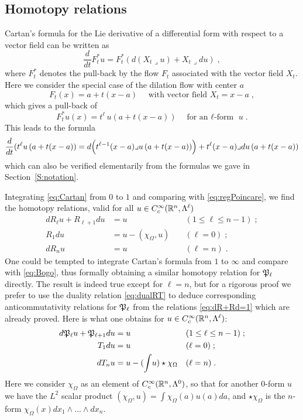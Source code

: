 \documentclass[a4paper]{article}
\begin{document}
\subsection{Homotopy relations}

Cartan's formula for the Lie derivative of a differential form with respect to a vector field can be written as
$$
  \frac{d}{dt}F^*_t u = F^*_t \left(d(X_t\lrcorner u) + X_t\lrcorner du\right)\;,
$$
where $F^*_t$ denotes the pull-back by the flow $F_t$ associated with the vector field $X_t$. Here we consider the special case of the dilation flow with center $a$
$$
  F_t(x) = a+t(x-a) \quad\text{ with vector field } X_t=x-a\;,
$$
which gives a pull-back of
$$
  F^*_t u(x) = t^\ell \,u\left(a+t(x-a)\right) \quad \text{for an $\ell$-form } u \;.
$$
This leads to the formula
\begin{equation}
\label{eq:Cartan}
 \frac{d}{dt}(t^\ell u\left(a+t(x-a)\right) =
    d\Bigl(t^{\ell-1}(x-a)\lrcorner u\left(a+t(x-a)\right)\Bigr) +
    t^{\ell}(x-a)\lrcorner du\left(a+t(x-a)\right)
\end{equation}
which can also be verified elementarily from the formulas we gave in Section~\ref{S:notation}.

Integrating \eqref{eq:Cartan} from $0$ to $1$ and comparing with \eqref{eq:regPoincare}, 
we find the homotopy relations, valid for all $u\in{C^\infty_c}({\mathbb R}^n,\Lambda^\ell)$ 
\begin{equation}
\begin{aligned}
\label{eq:dR+Rd=1}
 dR_{\ell} u + R_{\ell+1} du &= u\; &&(1\le\ell\le n-1)\;;\\
 R_1 du &= u - \left(\chi_{\Omega},u\right)\; &&(\ell=0)\;;\\
 dR_nu &=u &&(\ell=n)\;.
\end{aligned}
\end{equation}
One could be tempted to integrate Cartan's formula from $1$ to $\infty$ and compare with \eqref{eq:Bogo}, thus formally obtaining a similar homotopy relation for ${\mathfrak P}_{\ell}$ directly. The result is indeed true except for $\ell=n$, but for a rigorous proof we prefer to use the duality relation \eqref{eq:dualRT} to deduce corresponding anticommutativity relations for ${\mathfrak P}_{\ell}$ from the relations \eqref{eq:dR+Rd=1} which are already proved. Here is what one obtains for $u\in{C^\infty_c}({\mathbb R}^n,\Lambda^\ell)$:
\begin{equation}
\begin{aligned}
\label{eq:dT+Td=1}
  d{\mathfrak P}_{\ell} u + {\mathfrak P}_{\ell+1} du &= u\; &&(1\le\ell\le n-1)\;;\\
  T_1 du &= u \; &&(\ell=0)\;;\\
 dT_n u &=u - (\int\! u)\star\chi_{\Omega}&&(\ell=n)\;.
\end{aligned}
\end{equation}
Here we consider $\chi_{\Omega}$ as an element of ${C^\infty_c}({\mathbb R}^n,\Lambda^0)$, so that for another $0$-form $u$ we have the $L^2$ scalar product $\left(\chi_{\Omega},u\right)=\int\chi_{\Omega}(a)u(a)da$, and $\star\chi_{\Omega}$ is the $n$-form $\chi_{\Omega}(x)dx_1\wedge\dots\wedge dx_n$. 
\end{document}
